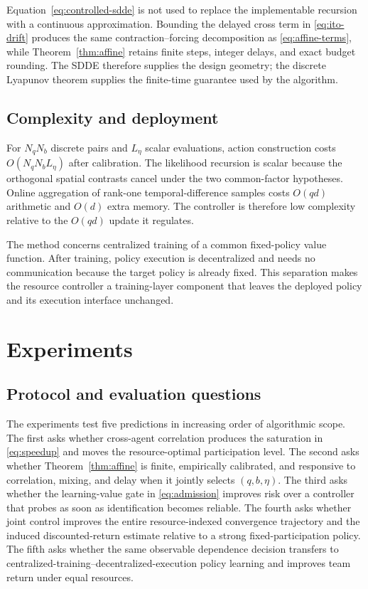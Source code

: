 \documentclass[journal]{IEEEtran}
\begin{document}
Equation~\eqref{eq:controlled-sdde} is not used to replace the implementable recursion with a continuous approximation.
Bounding the delayed cross term in \eqref{eq:ito-drift} produces the same contraction--forcing decomposition as \eqref{eq:affine-terms}, while Theorem~\ref{thm:affine} retains finite steps, integer delays, and exact budget rounding.
The SDDE therefore supplies the design geometry; the discrete Lyapunov theorem supplies the finite-time guarantee used by the algorithm.

\subsection{Complexity and deployment}
For $N_qN_b$ discrete pairs and $L_\eta$ scalar evaluations, action construction costs $O(N_qN_bL_\eta)$ after calibration.
The likelihood recursion is scalar because the orthogonal spatial contrasts cancel under the two common-factor hypotheses.
Online aggregation of rank-one temporal-difference samples costs $O(qd)$ arithmetic and $O(d)$ extra memory.
The controller is therefore low complexity relative to the $O(qd)$ update it regulates.

The method concerns centralized training of a common fixed-policy value function.
After training, policy execution is decentralized and needs no communication because the target policy is already fixed.
This separation makes the resource controller a training-layer component that leaves the deployed policy and its execution interface unchanged.

\section{Experiments}
\subsection{Protocol and evaluation questions}
The experiments test five predictions in increasing order of algorithmic scope.
The first asks whether cross-agent correlation produces the saturation in \eqref{eq:speedup} and moves the resource-optimal participation level.
The second asks whether Theorem~\ref{thm:affine} is finite, empirically calibrated, and responsive to correlation, mixing, and delay when it jointly selects $(q,b,\eta)$.
The third asks whether the learning-value gate in \eqref{eq:admission} improves risk over a controller that probes as soon as identification becomes reliable.
The fourth asks whether joint control improves the entire resource-indexed convergence trajectory and the induced discounted-return estimate relative to a strong fixed-participation policy.
The fifth asks whether the same observable dependence decision transfers to centralized-training--decentralized-execution policy learning and improves team return under equal resources.
\end{document}
